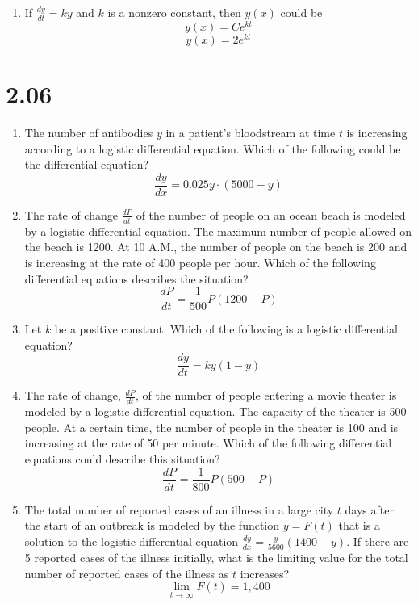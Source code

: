 \documentclass[12pt]{article}
\begin{document}
\begin{enumerate}
    \item If $\frac{dy}{dt}=ky$ and $k$ is a nonzero constant, then $y(x)$ could be
    $$y(x)=Ce^{kt}$$
    $$\boxed{y(x)=2e^{kt}}$$
\end{enumerate}
\section*{2.06}
\begin{enumerate}
    \item The number of antibodies $y$ in a patient’s bloodstream at time $t$ is increasing according to a logistic differential equation. Which of the following could be the differential equation?
    $$\boxed{\frac{dy}{dx}=0.025y \cdot (5000-y)}$$
    \item The rate of change $\frac{dP}{dt}$ of the number of people on an ocean beach is modeled by a logistic differential equation. The maximum number of people allowed on the beach is 1200. At 10 A.M., the number of people on the beach is 200 and is increasing at the rate of 400 people per hour. Which of the following differential equations describes the situation?
    $$\boxed{\frac{dP}{dt}=\frac{1}{500}P(1200-P)}$$
    \item Let $k$ be a positive constant. Which of the following is a logistic differential equation?
    $$\boxed{\frac{dy}{dt} = ky(1-y)}$$
    \item The rate of change, $\frac{dP}{dt}$, of the number of people entering a movie theater is modeled by a logistic differential equation. The capacity of the theater is 500 people. At a certain time, the number of people in the theater is 100 and is increasing at the rate of 50 per minute. Which of the following differential equations could describe this situation?
       $$\boxed{\frac{dP}{dt}=\frac{1}{800}P(500-P)}$$
    \item The total number of reported cases of an illness in a large city $t$ days after the start of an outbreak is modeled by the function $y=F(t)$ that is a solution to the logistic differential equation $\frac{dy}{dx}=\frac{y}{5600}(1400-y)$. If there are 5 reported cases of the illness initially, what is the limiting value for the total number of reported cases of the illness as $t$ increases?
    $$\boxed{\lim_{t\to\infty} F(t) = 1,400}$$
\end{enumerate}
\end{document}
